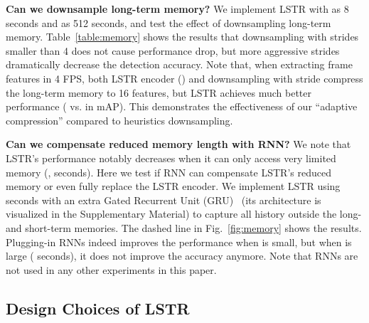 \textbf{Can we downsample long-term memory?}
We implement LSTR with  as 8 seconds and  as 512 seconds, and test the effect of downsampling long-term memory.
Table~\ref{table:memory} shows the results that downsampling with strides smaller than 4 does not cause performance drop, but more aggressive strides dramatically decrease the detection accuracy.
Note that, when extracting frame features in 4 FPS, both LSTR encoder () and downsampling with stride  compress the long-term memory to 16 features,
but LSTR achieves much better performance ( vs.  in mAP).
This demonstrates the effectiveness of our ``adaptive compression'' compared to heuristics downsampling. 

\textbf{Can we compensate reduced memory length with RNN?}
We note that LSTR's performance notably decreases when it can only access very limited memory (\eg,  seconds).
Here we test if RNN can compensate LSTR's reduced memory or even fully replace the LSTR encoder.
We implement LSTR using  seconds with an extra Gated Recurrent Unit (GRU)~\cite{chung2014empirical} (its architecture is visualized in the Supplementary Material)
to capture all history outside the long- and short-term memories.
The dashed line in Fig.~\ref{fig:memory} shows the results.
Plugging-in RNNs indeed improves the performance when  is small, but when  is large ( seconds), it does not improve the accuracy anymore.
Note that RNNs are not used in any other experiments in this paper.

\vspace{-2mm}
\subsection{Design Choices of LSTR}
\label{exp:lstr_design}
\vspace{-2mm}

